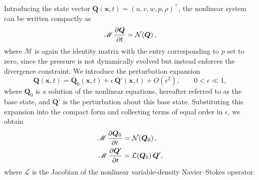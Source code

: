 Introducing the state vector \(\boldsymbol{Q}(\boldsymbol{x},t) = (u, v, w, p, \rho)^\top\), the nonlinear system can be written compactly as
\begin{equation}
    \label{eq:vd_compact_nl_continuous}
    \mathscr{M}\,\frac{\partial \boldsymbol{Q}}{\partial t} = \mathcal{N}\!\left( \boldsymbol{Q} \right),
\end{equation}
where \(\mathscr{M}\) is again the identity matrix with the entry corresponding to \(p\) set to zero, since the pressure is not dynamically evolved but instead enforces the divergence constraint.
We introduce the perturbation expansion
\begin{equation}
    \label{eq:vd_perturbation_expansion}
    \boldsymbol{Q}(\boldsymbol{x},t) = \boldsymbol{Q}_0(\boldsymbol{x},t) + \epsilon\,\boldsymbol{Q}'(\boldsymbol{x},t) + O(\epsilon^2),
    \qquad 0 < \epsilon \ll 1,
\end{equation}
where \(\boldsymbol{Q}_0\) is a solution of the nonlinear equations, hereafter referred to as the base state, and \(\boldsymbol{Q}'\) is the perturbation about this base state. Substituting this expansion into the compact form and collecting terms of equal order in \(\epsilon\), we obtain
\begin{subequations}
    \label{eq:vd_compact_lin_continuous}
    \begin{align}
        \label{eq:vd_compact_lin_continuous_0th}
        \mathscr{M}\,\frac{\partial \boldsymbol{Q}_0}{\partial t} &= \mathcal{N}\!\left( \boldsymbol{Q}_0 \right), \\
        \label{eq:vd_compact_lin_continuous_1th}
        \mathscr{M}\,\frac{\partial \boldsymbol{Q}'}{\partial t} &= \mathcal{L}(\boldsymbol{Q}_0)\,\boldsymbol{Q}',
    \end{align}
\end{subequations}
where \(\mathcal{L}\) is the Jacobian of the nonlinear variable-density Navier--Stokes operator.

